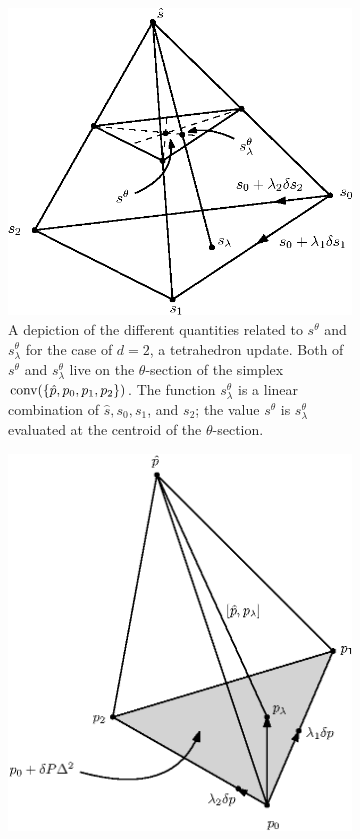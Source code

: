 \documentclass{article}
\begin{document}
\begin{figure}
  \centering
  \begin{subfigure}{.5\textwidth}
    \centering
    \includegraphics[width=0.95\linewidth]{slowness-tetra.eps}
    \caption{A depiction of the different quantities related to
      $s^{\theta}$ and $s^{\theta}_\lambda$ for the case of $d = 2$, a
      tetrahedron update. Both of $s^\theta$ and $s^\theta_\lambda$ live
      on the $\theta$-section of the simplex
      $\operatorname{conv}(\left\{\hat{p}, p_0, p_1, p_2\right\})$. The function
      $s^\theta_\lambda$ is a linear combination of $\hat{s}, s_0, s_1$,
      and $s_2$; the value $s^\theta$ is $s^\theta_\lambda$ evaluated at
      the centroid of the $\theta$-section.}\label{fig:slowness-tetra}
  \end{subfigure}%
  \hspace{.05\linewidth}
  \begin{subfigure}{.44\textwidth}
    \centering
    \includegraphics[width=0.95\linewidth]{simplex-diagram.eps}

\end{subfigure}
\end{figure}
\end{document}
